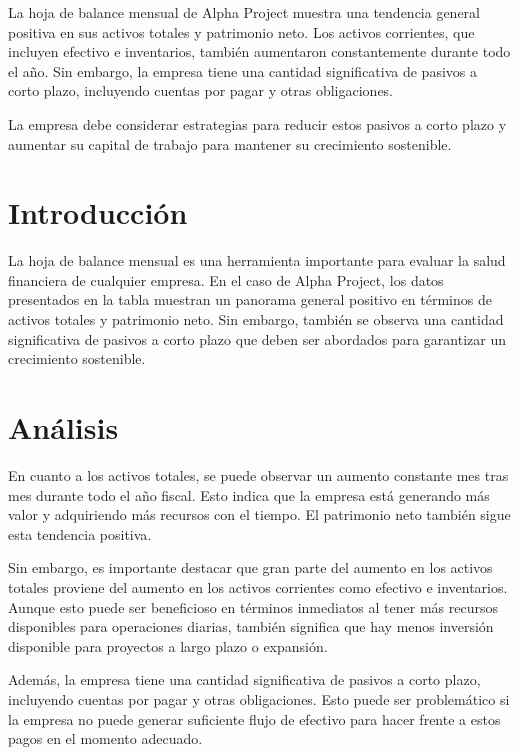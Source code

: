 
La hoja de balance mensual de Alpha Project muestra una tendencia general positiva en sus activos totales y patrimonio neto. Los activos corrientes, que incluyen efectivo e inventarios, también aumentaron constantemente durante todo el año. Sin embargo, la empresa tiene una cantidad significativa de pasivos a corto plazo, incluyendo cuentas por pagar y otras obligaciones. 

La empresa debe considerar estrategias para reducir estos pasivos a corto plazo y aumentar su capital de trabajo para mantener su crecimiento sostenible.

\section{Introducción}

La hoja de balance mensual es una herramienta importante para evaluar la salud financiera de cualquier empresa. En el caso de Alpha Project, los datos presentados en la tabla muestran un panorama general positivo en términos de activos totales y patrimonio neto. Sin embargo, también se observa una cantidad significativa de pasivos a corto plazo que deben ser abordados para garantizar un crecimiento sostenible.

\section{Análisis}

En cuanto a los activos totales, se puede observar un aumento constante mes tras mes durante todo el año fiscal. Esto indica que la empresa está generando más valor y adquiriendo más recursos con el tiempo. El patrimonio neto también sigue esta tendencia positiva.

Sin embargo, es importante destacar que gran parte del aumento en los activos totales proviene del aumento en los activos corrientes como efectivo e inventarios. Aunque esto puede ser beneficioso en términos inmediatos al tener más recursos disponibles para operaciones diarias, también significa que hay menos inversión disponible para proyectos a largo plazo o expansión.

Además, la empresa tiene una cantidad significativa de pasivos a corto plazo, incluyendo cuentas por pagar y otras obligaciones. Esto puede ser problemático si la empresa no puede generar suficiente flujo de efectivo para hacer frente a estos pagos en el momento adecuado.

